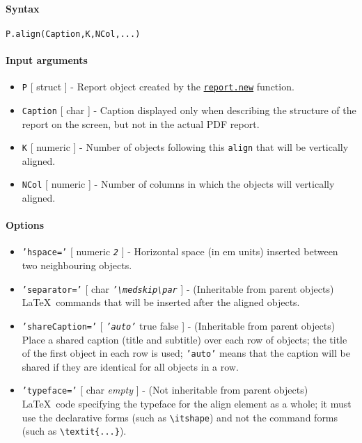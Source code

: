 


	\paragraph{Syntax}

\begin{verbatim}
P.align(Caption,K,NCol,...)
\end{verbatim}

\paragraph{Input arguments}

\begin{itemize}
\item
  \texttt{P} {[} struct {]} - Report object created by the
  \href{report/new}{\texttt{report.new}} function.
\item
  \texttt{Caption} {[} char {]} - Caption displayed only when describing
  the structure of the report on the screen, but not in the actual PDF
  report.
\item
  \texttt{K} {[} numeric {]} - Number of objects following this
  \texttt{align} that will be vertically aligned.
\item
  \texttt{NCol} {[} numeric {]} - Number of columns in which the objects
  will vertically aligned.
\end{itemize}

\paragraph{Options}

\begin{itemize}
\item
  \texttt{'hspace='} {[} numeric \textbar{} \emph{\texttt{2}} {]} -
  Horizontal space (in em units) inserted between two neighbouring
  objects.
\item
  \texttt{'separator='} {[} char \textbar{}
  \emph{\texttt{'\textbackslash{}medskip\textbackslash{}par}} {]} -
  (Inheritable from parent objects) \LaTeX~commands that will be
  inserted after the aligned objects.
\item
  \texttt{'shareCaption='} {[} \emph{\texttt{'auto'}} \textbar{} true
  \textbar{} false {]} - (Inheritable from parent objects) Place a
  shared caption (title and subtitle) over each row of objects; the
  title of the first object in each row is used; \texttt{'auto'} means
  that the caption will be shared if they are identical for all objects
  in a row.
\item
  \texttt{'typeface='} {[} char \textbar{} \emph{empty} {]} - (Not
  inheritable from parent objects) \LaTeX~code specifying the typeface
  for the align element as a whole; it must use the declarative forms
  (such as \texttt{\textbackslash{}itshape}) and not the command forms
  (such as \texttt{\textbackslash{}textit\{...\}}).
\end{itemize}

